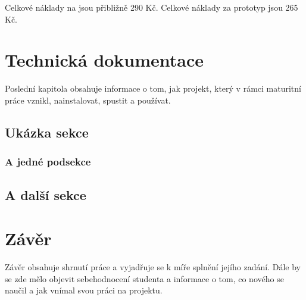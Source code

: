 \documentclass[11pt,a4paper,twoside,openright]{report}
\let\openright=\cleardoublepage
\begin{document}
Celkové náklady na  jsou přibližně 290 Kč.
Celkové náklady za prototyp  jsou 265 Kč.
\chapter{Technická dokumentace}

Poslední kapitola obsahuje informace o tom, jak projekt, který v rámci maturitní práce vznikl, nainstalovat, spustit a používat.

\section{Ukázka sekce}


\subsection{A jedné podsekce}


\section{A další sekce}


\chapter*{Závěr}
\pagestyle{empty}

Závěr obsahuje shrnutí práce a vyjadřuje se k míře splnění jejího zadání. Dále by se zde mělo objevit sebehodnocení studenta a informace o tom, co nového se naučil a jak vnímal svou práci na projektu.

\nocite{einstein}\nocite{latexcompanion}\nocite{knuthwebsite}
\printbibliography[title={Seznam použité literatury},heading={bibintoc}]

\openright
\listoffigures
{}

\clearpage
\listoftables
{}


\end{document}
